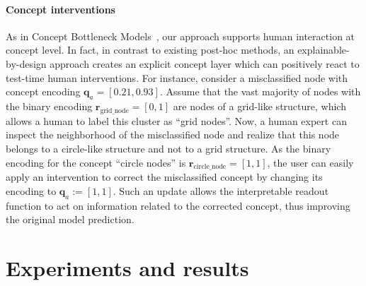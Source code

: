 \documentclass[withindex,glossary]{cam-thesis}
\theoremstyle{plain}
\theoremstyle{definition}
\theoremstyle{remark}
\begin{document}
\paragraph{Concept interventions}
As in Concept Bottleneck Models~\citep{koh2020concept}, our approach supports human interaction at concept level. In fact, in contrast to existing post-hoc methods, an explainable-by-design approach creates an explicit concept layer which can positively react to test-time human interventions. For instance, consider a misclassified node with concept encoding $\mathbf{q}_a = [0.21, 0.93]$. Assume that the vast majority of nodes with the binary encoding $\mathbf{r}_{\text{grid\_node}} = [0, 1]$ are nodes of a grid-like structure, which allows a human to label this cluster as ``grid nodes''. Now, a human expert can inspect the neighborhood of the misclassified node and realize that this node belongs to a circle-like structure and not to a grid structure. As the binary encoding for the concept ``circle nodes'' is $\mathbf{r}_{\text{circle\_node}} = [1, 1]$, the user can easily apply an intervention to correct the misclassified concept by changing its encoding to $\mathbf{q}_a:=[1, 1]$. Such an update allows the interpretable readout function to act on information related to the corrected concept, thus improving the original model prediction.

\section{Experiments and results}
\end{document}
